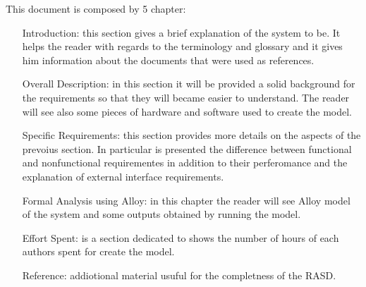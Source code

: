 This document is composed by 5 chapter:
\begin{enumerate}
	\item[Introduction:] this section gives a brief explanation of the system to be. It helps the reader with regards to the terminology and glossary and it gives him information about the documents that were used as references. 
	
	\item[Overall Description:] in this section it will be provided a solid background for the requirements so that they will became easier to understand. The reader will see also some pieces of hardware and software used to create the model.
	
	\item[Specific Requirements:] this section provides more details on the aspects of the prevoius section. In particular is presented the difference between functional and nonfunctional requirementes in addition to their perferomance and the explanation of external interface requirements.
	
	\item[Formal Analysis  using Alloy:] in this chapter the reader will see Alloy model of the system and some outputs obtained by running the model.
	
	\item[Effort Spent:]  is a section dedicated to shows the number of hours of each authors spent for create the model. 
	
	\item[Reference: ] addiotional material usuful for the completness of the RASD.
\end{enumerate}
